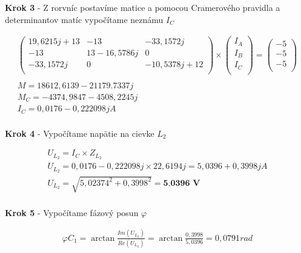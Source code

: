 \begin{center}
    \textbf{Krok 3} - Z rorvníc postavíme matice a pomocou Cramerového pravidla a determinantov matíc vypočítame neznámu  $I_C$
\end{center}

\begin{gather*}
	\begin{pmatrix}
		19,6215j+13 & -13 & -33,1572j \\
		-13 & 13-16,5786j  & 0 \\
		-33,1572j & 0 & -10,5378j+12\\
	\end{pmatrix}
	\times
	\begin{pmatrix}
		I_A \\
		I_B \\
		I_C \\
	\end{pmatrix}
	=
	\begin{pmatrix}
		-5 \\
		-5 \\
		-5 \\
	\end{pmatrix} \\
	\\
	M = 18612,6139-21179.7337j \\
	M_C = -4374,9847-4508,2245j \\
	I_C = 0,0176-0,222098j A \\
\end{gather*}

\begin{center}
    \textbf{Krok 4} - Vypočítame napätie na cievke $L_2$
\end{center}

\begin{gather*}
U_{L_2} = I_C \times Z_{L_2} \\
U_{L_2} =  0,0176-0,222098j \times   22,6194j = 5,0396 + 0,3998j A \\
U_{L_2} = \sqrt{5,02374^2 + 0,3998^2} = \textbf{5,0396 V} \\
\end{gather*}

\begin{center}
    \textbf{Krok 5} - Vypočítame fázový posun $\varphi$
\end{center}

\begin{gather*}
\varphi C_1 = \arctan{\frac{Im(U_{L_2})}{Re(U_{L_{2}})}} =\arctan{\frac{0,3998}{5,0396}} = 0,0791 rad \\ 
\end{gather*}


